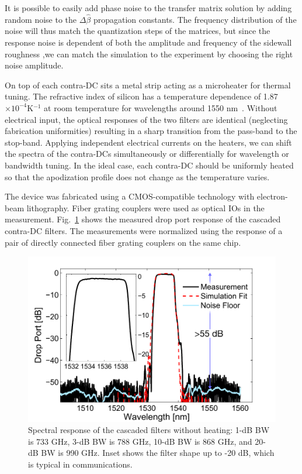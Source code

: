 \documentclass[osajnl,twocolumn,showpacs,superscriptaddress,10pt]{revtex4-1}
\begin{document}
It is possible to easily add phase noise to the transfer matrix solution by adding random noise to the $\Delta\hat{\beta}$ propagation constants. The frequency distribution of the noise will thus match the quantization steps of the matrices, but since the response noise is dependent of both the amplitude and frequency of the sidewall roughness \cite{simard2011impact},we can match the simulation to the experiment by choosing the right noise amplitude.


On top of each contra-DC sits a metal strip acting as a microheater for thermal tuning.  
The refractive index of silicon has a temperature dependence of 1.87$\times10^{-4}$K$^{-1}$ at room temperature for wavelengths around 1550 nm~\cite{frey2006temperature}.
Without electrical input, the optical responses of the two filters are identical (neglecting fabrication uniformities) resulting in a sharp transition from the pass-band to the stop-band. 
Applying independent electrical currents on the heaters, we can shift the spectra of the contra-DCs simultaneously or differentially for wavelength or bandwidth tuning.
In the ideal case, each contra-DC should be uniformly heated so that the apodization profile does not change as the temperature varies.



The device was fabricated using a CMOS-compatible technology with electron-beam lithography. 
Fiber grating couplers\cite{zhong2014focusingFGC} were used as optical IOs in the measurement. 
Fig.~\ref{fig:passive} shows the measured drop port response of the cascaded contra-DC filters. 
The measurements were normalized using the response of a pair of directly connected fiber grating couplers on the same chip.
\begin{figure}[htbp]
\centering
\includegraphics[width=.99\columnwidth]{data/Passive6}
\caption{ Spectral response of the cascaded filters without heating: 1-dB BW is 733 GHz, 3-dB BW is 788 GHz, 10-dB BW is 868 GHz, and 20-dB BW is 990 GHz. Inset shows the filter shape up to -20 dB, which is typical in communications.}
\label{fig:passive}
\end{figure}
\end{document}
